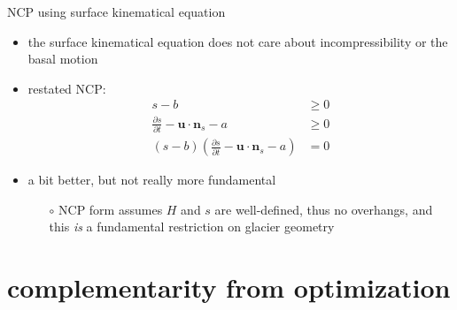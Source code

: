 \documentclass[10pt,hyperref,dvipsnames]{beamer}
\newcommand{\bn}{\mathbf{n}}
\newcommand{\bu}{\mathbf{u}}
\begin{document}
\begin{frame}{NCP using surface kinematical equation}

\begin{itemize}
\item the surface kinematical equation does not care about incompressibility or the basal motion
\item restated NCP:
\begin{align*}
s-b &\ge 0 \\
\frac{\partial s}{\partial t} - \bu \cdot \bn_s - a &\ge 0 \\
(s-b) \left(\frac{\partial s}{\partial t} - \bu \cdot \bn_s - a\right) &= 0
\end{align*}

\medskip
\item a bit better, but not really more fundamental
    \begin{itemize}
    \item[$\circ$] NCP form assumes $H$ and $s$ are well-defined, thus no overhangs, and this \emph{is} a fundamental restriction on glacier geometry
    \end{itemize}
\end{itemize}
\end{frame}


\section{complementarity from optimization}

\newcommand{\blambda}{\bm{\lambda}}
\end{document}
